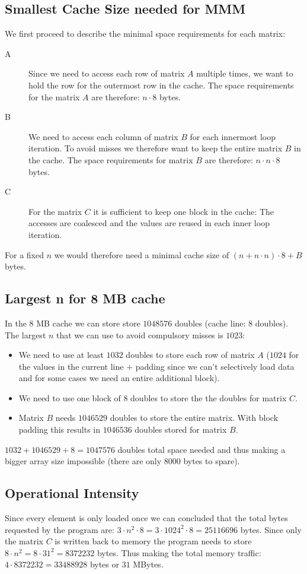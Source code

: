 \documentclass[portrait,a4paper]{article}
\begin{document}
\subsection{Smallest Cache Size needed for MMM}
We first proceed to describe the minimal space requirements for each matrix:
\begin{description}
\item[A] Since we need to access each row of matrix $A$ multiple times, we want to hold the row for the outermost row in the cache. The space requirements for the matrix $A$ are therefore: $n\cdot 8$ bytes.
\item[B] We need to access each column of matrix $B$ for each innermost loop iteration. To avoid misses we therefore want to keep the entire matrix $B$ in the cache. The space requirements for matrix $B$ are therefore: $n\cdot n \cdot 8$ bytes.
\item[C] For the matrix $C$ it is sufficient to keep one block in the cache: The accesses are coalesced and the values are reused in each inner loop iteration.
\end{description}
For a fixed $n$ we would therefore need a minimal cache size of $(n+n\cdot n)\cdot 8 + B$ bytes.

\subsection{Largest n for 8 MB cache}
In the $8$ MB cache we can store store $1048576$ doubles (cache line: $8$ doubles).
The largest $n$ that we can use to avoid compulsory misses is $1023$:
\begin{itemize}
    \item We need to use at least $1032$ doubles to store each row of matrix $A$ ($1024$ for the values in the current line $+$ padding since we can't selectively load data and for some cases we need an entire additional block). 
    \item We need to use one block of $8$ doubles to store the the doubles for matrix $C$. 
    \item Matrix $B$ needs $1046529$ doubles to store the entire matrix. With block padding this results in $1046536$ doubles stored for matrix $B$.
\end{itemize}

$1032+ 1046529 + 8= 1047576$ doubles total space needed and thus making a bigger array size impossible (there are only $8000$ bytes to spare).

\subsection{Operational Intensity}
Since every element is only loaded once we can concluded that the total bytes requested by the program are: $3\cdot n^2 \cdot 8= 3\cdot 1024^2\cdot 8 = 25116696$ bytes. Since only the matrix $C$ is written back to memory the program needs to store $8\cdot n^2 =8\cdot 31^2 = 8372232$ bytes. Thus making the total memory traffic: $4\cdot 8372232 = 33488928$ bytes or $31$ MBytes. 
\end{document}
